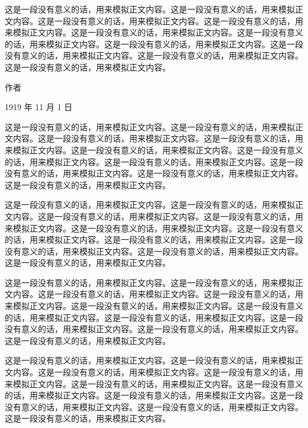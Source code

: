 这是一段没有意义的话，用来模拟正文内容。这是一段没有意义的话，用来模拟正文内容。这是一段没有意义的话，用来模拟正文内容。这是一段没有意义的话，用来模拟正文内容。这是一段没有意义的话，用来模拟正文内容。这是一段没有意义的话，用来模拟正文内容。这是一段没有意义的话，用来模拟正文内容。这是一段没有意义的话，用来模拟正文内容。这是一段没有意义的话，用来模拟正文内容。这是一段没有意义的话，用来模拟正文内容。

\closing{作者}{1919 年 11 月 1 日}



这是一段没有意义的话，用来模拟正文内容。这是一段没有意义的话，用来模拟正文内容。这是一段没有意义的话，用来模拟正文内容。这是一段没有意义的话，用来模拟正文内容。这是一段没有意义的话，用来模拟正文内容。这是一段没有意义的话，用来模拟正文内容。这是一段没有意义的话，用来模拟正文内容。这是一段没有意义的话，用来模拟正文内容。这是一段没有意义的话，用来模拟正文内容。这是一段没有意义的话，用来模拟正文内容。

\hr{}

这是一段没有意义的话，用来模拟正文内容。这是一段没有意义的话，用来模拟正文内容。这是一段没有意义的话，用来模拟正文内容。这是一段没有意义的话，用来模拟正文内容。这是一段没有意义的话，用来模拟正文内容。这是一段没有意义的话，用来模拟正文内容。这是一段没有意义的话，用来模拟正文内容。这是一段没有意义的话，用来模拟正文内容。这是一段没有意义的话，用来模拟正文内容。这是一段没有意义的话，用来模拟正文内容。

这是一段没有意义的话，用来模拟正文内容。这是一段没有意义的话，用来模拟正文内容。这是一段没有意义的话，用来模拟正文内容。这是一段没有意义的话，用来模拟正文内容。这是一段没有意义的话，用来模拟正文内容。这是一段没有意义的话，用来模拟正文内容。这是一段没有意义的话，用来模拟正文内容。这是一段没有意义的话，用来模拟正文内容。这是一段没有意义的话，用来模拟正文内容。这是一段没有意义的话，用来模拟正文内容。


这是一段没有意义的话，用来模拟正文内容。这是一段没有意义的话，用来模拟正文内容。这是一段没有意义的话，用来模拟正文内容。这是一段没有意义的话，用来模拟正文内容。这是一段没有意义的话，用来模拟正文内容。这是一段没有意义的话，用来模拟正文内容。这是一段没有意义的话，用来模拟正文内容。这是一段没有意义的话，用来模拟正文内容。这是一段没有意义的话，用来模拟正文内容。这是一段没有意义的话，用来模拟正文内容。

